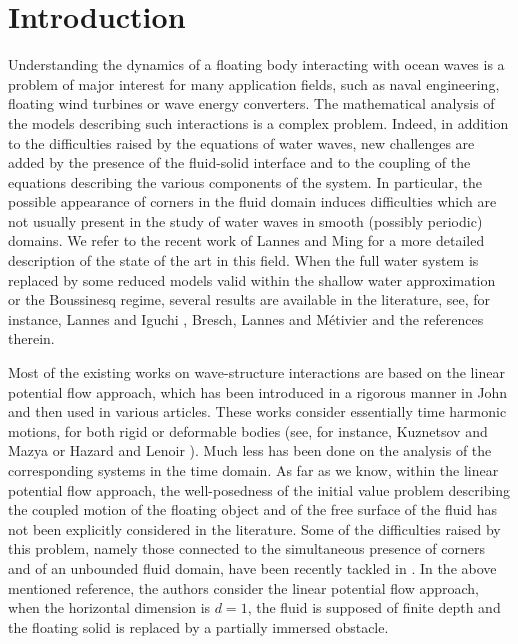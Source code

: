 \documentclass{amsart} %
\numberwithin{equation}{section}
\theoremstyle{definition}
\begin{document}
\section{Introduction} 
Understanding the dynamics of a floating body interacting with ocean waves is a problem of major interest for many application fields, such as naval engineering, floating wind turbines or  wave energy converters.
The mathematical analysis of the models describing such interactions is a complex problem. Indeed, in addition to the difficulties raised by the equations of water waves, new challenges are added by the presence of the fluid-solid interface and to the coupling of the equations describing the various components of the system. In particular, the possible appearance of corners in the fluid domain induces difficulties which are not usually present in the study of water waves in  smooth (possibly periodic) domains. We refer to the recent work of Lannes and Ming \cite{lannes2024posednessfjohnsfloating} for a more detailed description of the state of the art in this field.  When the full water system is replaced by some reduced models valid within the shallow water approximation or the Boussinesq regime, several results are available in the literature, see, for instance, Lannes and Iguchi \cite{iguchi2021hyperbolic},  Bresch, Lannes and M{\'e}tivier \cite{bresch2021waves} and the references therein.

 Most of the existing works on wave-structure interactions are based on the linear potential flow approach, which has been introduced in a rigorous manner in John \cite{john1949motion} and then used in various articles. These works consider essentially time harmonic motions, for both rigid or deformable bodies (see, for instance, Kuznetsov and Mazya \cite{kuznetsov2003linear} or Hazard and Lenoir \cite{hazard1993determination}). Much less has been done on the analysis of the corresponding systems in the time domain. As far as we know, within the linear potential flow approach, 
 the well-posedness of the initial value problem describing the coupled motion of the floating object and of the free surface of the fluid has not been explicitly considered in the literature. Some of the difficulties raised by this problem, namely those connected to the simultaneous presence of corners and of an unbounded fluid domain,  have been recently tackled in \cite{lannes2024posednessfjohnsfloating}. In the above mentioned reference, the authors consider  the linear potential flow approach, when the horizontal dimension is $d=1$, the fluid is supposed of finite depth and the floating solid is replaced by a partially immersed obstacle.
 
\end{document}
